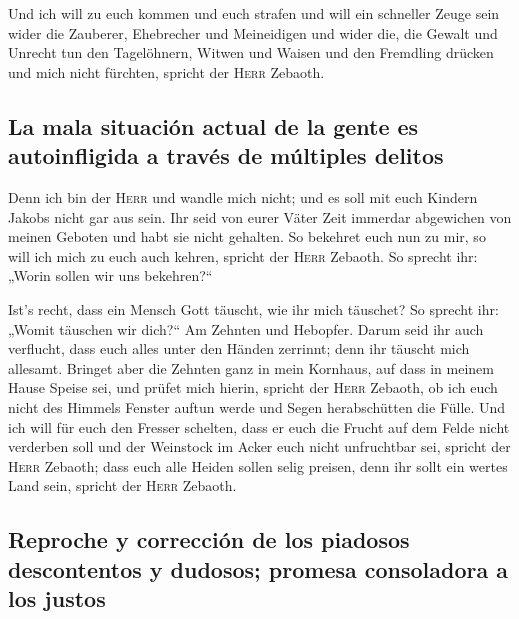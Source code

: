  Und ich will zu euch kommen und euch strafen und will ein
schneller Zeuge sein wider die Zauberer, Ehebrecher und Meineidigen und
wider die, die Gewalt und Unrecht tun den Tagelöhnern, Witwen und Waisen
und den Fremdling drücken und mich nicht fürchten, spricht der
\textsc{Herr} Zebaoth.

\hypertarget{la-mala-situaciuxf3n-actual-de-la-gente-es-autoinfligida-a-travuxe9s-de-muxfaltiples-delitos}{%
\subsection{La mala situación actual de la gente es autoinfligida a
través de múltiples
delitos}\label{la-mala-situaciuxf3n-actual-de-la-gente-es-autoinfligida-a-travuxe9s-de-muxfaltiples-delitos}}

 Denn ich bin der \textsc{Herr} und wandle mich nicht; und
es soll mit euch Kindern Jakobs nicht gar aus sein.  Ihr
seid von eurer Väter Zeit immerdar abgewichen von meinen Geboten und
habt sie nicht gehalten. So bekehret euch nun zu mir, so will ich mich
zu euch auch kehren, spricht der \textsc{Herr} Zebaoth. So sprecht ihr:
„Worin sollen wir uns bekehren?{}``

 Ist's recht, dass ein Mensch Gott täuscht, wie ihr mich
täuschet? So sprecht ihr: „Womit täuschen wir dich?{}`` Am Zehnten und
Hebopfer.  Darum seid ihr auch verflucht, dass euch alles
unter den Händen zerrinnt; denn ihr täuscht mich allesamt.
 Bringet aber die Zehnten ganz in mein Kornhaus, auf dass
in meinem Hause Speise sei, und prüfet mich hierin, spricht der
\textsc{Herr} Zebaoth, ob ich euch nicht des Himmels Fenster auftun
werde und Segen herabschütten die Fülle.  Und ich will
für euch den Fresser schelten, dass er euch die Frucht auf dem Felde
nicht verderben soll und der Weinstock im Acker euch nicht unfruchtbar
sei, spricht der \textsc{Herr} Zebaoth;  dass euch alle
Heiden sollen selig preisen, denn ihr sollt ein wertes Land sein,
spricht der \textsc{Herr} Zebaoth.

\hypertarget{reproche-y-correcciuxf3n-de-los-piadosos-descontentos-y-dudosos-promesa-consoladora-a-los-justos}{%
\subsection{Reproche y corrección de los piadosos descontentos y
dudosos; promesa consoladora a los
justos}\label{reproche-y-correcciuxf3n-de-los-piadosos-descontentos-y-dudosos-promesa-consoladora-a-los-justos}}

